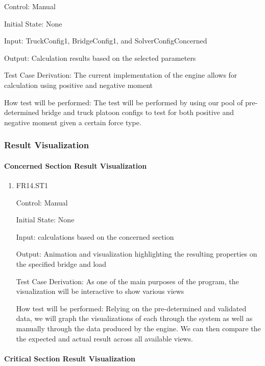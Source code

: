 \documentclass[12pt, titlepage]{article}
\begin{document}
\begin{enumerate}
Control: Manual
					
Initial State: None
					
Input: TruckConfig1, BridgeConfig1, and SolverConfigConcerned 
					 
Output: Calculation results based on the selected parameters 

Test Case Derivation: The current implementation of the engine allows for calculation using positive and negative moment 

How test will be performed: The test will be performed by using our pool of pre-determined bridge and truck platoon configs to test for both positive and negative moment given a certain force type. 

\end{enumerate}

\subsubsection{Result Visualization}

\paragraph{Concerned Section Result Visualization}

\begin{enumerate}

\item{FR14.ST1\\}

Control: Manual
				
Initial State: None
					
Input: calculations based on the concerned section 
					
Output: Animation and visualization highlighting the resulting properties on the specified bridge and load 

Test Case Derivation: As one of the main purposes of the program, the visualization will be interactive to show various views

How test will be performed: Relying on the pre-determined and validated data, we will graph the visualizations of each through the system as well as manually through the data produced by the engine. We can then compare the the expected and actual result across all available views. 
			
\end{enumerate}

\paragraph{Critical Section Result Visualization}
\end{document}
